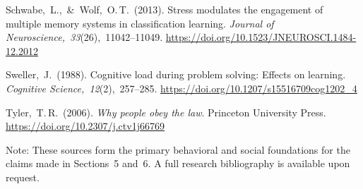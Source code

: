 Schwabe, L., \& Wolf, O.\,T. (2013). Stress modulates the engagement of multiple memory systems in classification learning. \emph{Journal of Neuroscience, 33}(26), 11042–11049. \url{https://doi.org/10.1523/JNEUROSCI.1484-12.2012}

Sweller, J. (1988). Cognitive load during problem solving: Effects on learning. \emph{Cognitive Science, 12}(2), 257–285. \url{https://doi.org/10.1207/s15516709cog1202_4}

Tyler, T.\,R. (2006). \emph{Why people obey the law}. Princeton University Press. \url{https://doi.org/10.2307/j.ctv1j66769}

\medskip\noindent
Note: These sources form the primary behavioral and social foundations for the claims made in Sections 5 and 6. A full research bibliography is available upon request.
